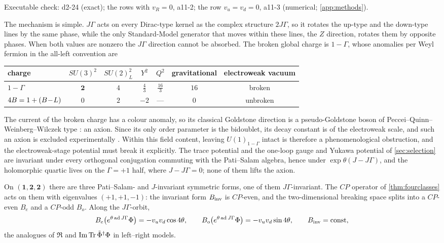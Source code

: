 \noindent Executable check: d2-24 (exact); the rows with $v_R=0$, a11-2; the row $v_u=v_d=0$, a11-3 (numerical; \cref{app:methods}).

The mechanism is simple. $J\Gamma$ acts on every Dirac-type kernel as the complex structure $2J\Gamma$, so it rotates the up-type and the down-type lines by the
same phase, while the only Standard-Model generator that moves within these lines, the $Z$ direction, rotates them by opposite phases. When both values are
nonzero the $J\Gamma$ direction cannot be absorbed. The broken global charge is $1-\Gamma$, whose anomalies per Weyl fermion in the all-left convention are
\begin{center}
\small
\begin{tabular}{@{}lcccccc@{}}
\toprule
charge & $SU(3)^2$ & $SU(2)_L^2$ & $Y^2$ & $Q^2$ & gravitational & electroweak vacuum\\
\midrule
$1-\Gamma$ & $\mathbf2$ & $4$ & $\tfrac43$ & $\tfrac{16}3$ & $16$ & broken\\
$4B=1+(B\!-\!L)$ & $0$ & $2$ & $-2$ & --- & $0$ & unbroken\\
\bottomrule
\end{tabular}
\end{center}
The current of the broken charge has a colour anomaly, so its classical Goldstone direction is a pseudo-Goldstone boson of Peccei--Quinn--Weinberg--Wilczek
type \cite{PecceiQuinn77,Weinberg78,Wilczek78}: an axion. Since its only order parameter is the bidoublet, its decay constant is of the electroweak scale, and such an
axion is excluded experimentally \cite{Konaka86,PecceiWuYanagida86,PDG}. Within this field content, leaving $U(1)_{1-\Gamma}$ intact is therefore a phenomenological obstruction, and the
electroweak-stage potential must break it explicitly. The trace potential and the one-loop gauge and Yukawa potential of \cref{sec:selection} are invariant
under every orthogonal conjugation commuting with the Pati--Salam algebra, hence under $\exp\theta(J-J\Gamma)$, and the holomorphic quartic lives on the
$\Gamma=+1$ half, where $J-J\Gamma=0$; none of them lifts the axion.

\begin{proposition}
\label{prop:bidoublet}
On $(\mathbf1,\mathbf2,\mathbf2)$ there are three Pati--Salam- and $J$-invariant symmetric forms, one of them $J\Gamma$-invariant. The $CP$ operator of
\cref{thm:fourclasses} acts on them with eigenvalues $(+1,+1,-1)$: the invariant form $B_{\rm inv}$ is $CP$-even, and the two-dimensional breaking space splits into a
$CP$-even $B_e$ and a $CP$-odd $B_o$. Along the $J\Gamma$-orbit,
\[
B_e\bigl(e^{\theta\operatorname{ad} J\Gamma}\Phi\bigr)=-v_uv_d\cos4\theta,\qquad B_o\bigl(e^{\theta\operatorname{ad} J\Gamma}\Phi\bigr)=-v_uv_d\sin4\theta,\qquad B_{\rm inv}=\text{const},
\]
the analogues of $\Re$ and $\operatorname{Im}\operatorname{Tr}\tilde\Phi^\dagger\Phi$ in left--right models.
\end{proposition}

